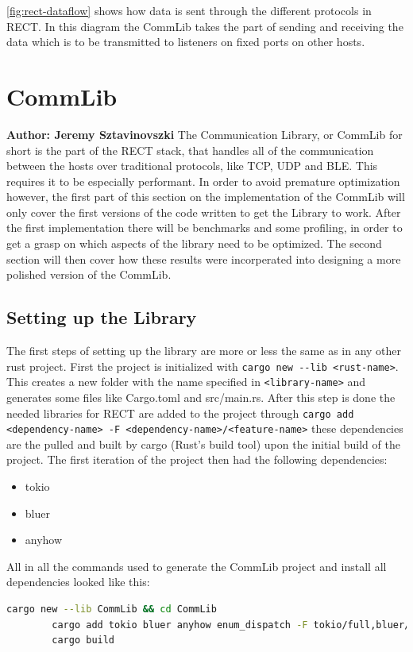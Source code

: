 \ref{fig:rect-dataflow} shows how data is sent through the different protocols in RECT.
In this diagram the CommLib takes the part of sending and receiving the data which is to be transmitted to listeners on fixed ports
on other hosts.

\section{CommLib}
\textbf{Author: Jeremy Sztavinovszki} 
The Communication Library, or CommLib for short is the part of the RECT stack, that handles all of the communication between the hosts over traditional protocols, like TCP, UDP and BLE.
This requires it to be especially performant. In order to avoid premature optimization however, the first part of this section on the implementation of the CommLib will only cover the first versions
of the code written to get the Library to work. After the first implementation there will be benchmarks and some profiling, in order to get a grasp on which aspects of the library need to be
optimized. The second section will then cover how these results were incorperated into designing a more polished version of the CommLib.

\subsection{Setting up the Library} 
The first steps of setting up the library are more or less the same as in any other rust project. First the project is initialized with \verb+cargo new --lib <rust-name>+. This creates a
new folder with the name specified in \verb+<library-name>+ and generates some files like Cargo.toml and src/main.rs. After this step is done the needed libraries for RECT are added to the
project through \verb+cargo add <dependency-name> -F <dependency-name>/<feature-name>+ these dependencies are the pulled and built by cargo (Rust's build tool) upon the initial build of the
project. The first iteration of the project then had the following dependencies:

\begin{itemize}
	\item tokio
	\item bluer
	\item anyhow
\end{itemize}

All in all the commands used to generate the CommLib project and install all dependencies looked like this:
\newline
\begin{minipage}{\textwidth}
	\begin{lstlisting}[language=bash, caption=Setup Commands for CommLib]
		cargo new --lib CommLib && cd CommLib
		cargo add tokio bluer anyhow enum_dispatch -F tokio/full,bluer/full
		cargo build
	\end{lstlisting}
\end{minipage}

